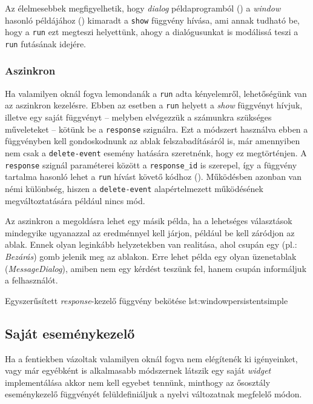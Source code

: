 Az élelmesebbek megfigyelhetik, hogy \textit{dialog} példaprogramból () a \textit{window} hasonló példájához () kimaradt a \texttt{show} függvény hívása, ami annak tudható be, hogy a \texttt{run} ezt megteszi helyettünk, ahogy a dialógusunkat is modálissá teszi a \texttt{run} futásának idejére.

\subsubsection{Aszinkron}

Ha valamilyen oknál fogva lemondanák a \texttt{run} adta kényelemről, lehetőségünk van az aszinkron kezelésre. Ebben az esetben a \texttt{run} helyett a \textit{show} függvényt hívjuk, illetve egy saját függvényt -- melyben elvégezzük a számunkra szükséges műveleteket -- kötünk be a \texttt{response} szignálra. Ezt a módszert használva ebben a függvényben kell gondoskodnunk az ablak felszabadításáról is, már amennyiben nem csak a \texttt{delete-event} esemény hatására szeretnénk, hogy ez megtörténjen. A \texttt{response} szignál paraméterei között a \texttt{response\_id} is szerepel, így a függvény tartalma hasonló lehet a \texttt{run} hívást követő kódhoz (). Működésben azonban van némi különbség, hiszen a \texttt{delete-event} alapértelmezett működésének megváltoztatására például nincs mód.

Az aszinkron a megoldásra lehet egy másik példa, ha a lehetséges választások mindegyike ugyanazzal az eredménnyel kell járjon, például be kell záródjon az ablak. Ennek olyan leginkább helyzetekben van realitása, ahol csupán egy (pl.: \textit{Bezárás}) gomb jelenik meg az ablakon. Erre lehet példa egy olyan üzenetablak (\textit{MessageDialog}), amiben nem egy kérdést teszünk fel, hanem csupán informáljuk a felhasználót.

{Egyszerűsített \textit{response}-kezelő függvény bekötése}
{lst:windowpersistentsimple}

\subsection{Saját eseménykezelő}

Ha a fentiekben vázoltak valamilyen oknál fogva nem elégítenék ki igényeinket, vagy már egyébként is alkalmasabb módszernek látszik egy saját \textit{widget} implementálása akkor nem kell egyebet tennünk, minthogy az ősosztály eseménykezelő függvényét felüldefiniáljuk a nyelvi változatnak megfelelő módon.

